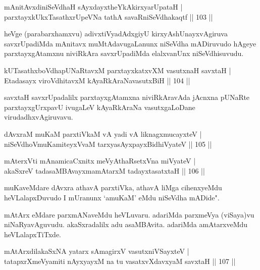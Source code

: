 \begin{shl}
mAnitAvxdiniSeVdhaH sAyxdayxtheYkAkirxyarUpataH |\\
parxtayxkUkxTasathxrUpeVNa tathA savaRniSeVdhakaqtf \hfill || 103 ||
\end{shl}

\begin{artha}
heVge (parabarxhamxvu) adivxtiVyadAdxgiyU kirxyAshUnayxvAgiruva savxrUpadiMda mAnitavx muMtAdavugaLanunx niSeVdha mADiruvudo hAgeye parxtayxgAtamxnu niviRkAra savxrUpadiMda elalxvanUnx niSeVdhisuvudu.
\end{artha}


\begin{shl}
kUTasathxboVdhapUNaRtavxM parxtayxkatxvXM vasutxnaH savxtaH |\\
Etadasayx viroVdhitavxM kAyaRkAraNavasutxBiH \hfill || 104 ||
\end{shl}

\begin{artha}
savxtaH savxrUpadalilx parxtayxgAtamxna niviRkAravAda jAcnxna pUNaRte parxtayxgUrxpavU ivugaLeV kAyaRkAraNa vasutxgaLoDane virudadhxvAgiruvavu.
\end{artha}

\begin{shl}
dAvxraM muKaM parxtiVkaM vA yadi vA liknagxmucayxteV |\\
niSeVdhoV\s muKamiteyxVvaM tarxyasAyxpayxBidhiVyateV \hfill || 105 ||
\end{shl}

\begin{shl}
mAterxVti mAnamicaCxnitx meVyA\s thaRsetxVna miVyateV |\\
akaSxreV tadasaMBAvayxmamAtarxM tadayxtasatxtaH \hfill || 106 ||
\end{shl}

\begin{artha}
muKaveMdare dAvxra athavA parxtiVka, athavA liMga cihenxyeMdu heVLalapxDu\-vudo I mUranunx `amuKaM' eMdu niSeVdha mADide".
\end{artha}

\begin{artha}%
mAtArx eMdare parxmANaveMdu heVLuvaru. adariMda parxmeVya (viSaya)vu niNaRyavAguvudu. akaSxradalilx adu asaMBAvita. adariMda amAtarxveMdu heVLalapxTiTxde. 
\end{artha}

\begin{shl}
mAtArxdilakaSxNA yatarx sAmagirxV vasutxniVSayxteV |\\
tatapxrXmeVyamiti nAyxyayxM na tu vasatxvXdavxyaM savxtaH \hfill || 107 ||
\end{shl}

